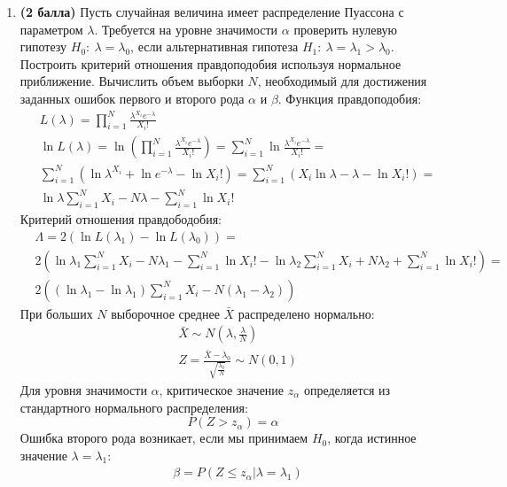 \documentclass{assignment}
\begin{document}
\begin{enumerate}
    \item \textbf{(2 балла)} Пусть случайная величина имеет распределение Пуассона с параметром $\lambda$. Требуется на уровне значимости $\alpha$ проверить нулевую гипотезу $H_0:~ \lambda = \lambda_0$, если альтернативная гипотеза $H_1:~ \lambda = \lambda_1 > \lambda_0$. Построить критерий отношения правдоподобия используя нормальное приближение. Вычислить объем выборки $N$, необходимый для достижения заданных ошибок первого и второго рода $\alpha$ и $\beta$.
    \start
    Функция правдоподобия:
    \begin{align*}
        &L(\lambda) = \prod_{i=1}^{N} \frac{\lambda^{X_i}e^{-\lambda}}{X_i!} \\
        &\ln L(\lambda) = \ln (\prod_{i=1}^{N} \frac{\lambda^{X_i}e^{-\lambda}}{X_i!}) = \sum_{i=1}^{N} \ln\frac{\lambda^{X_i}e^{-\lambda}}{X_i!} = \\
        &\sum_{i=1}^{N} (\ln\lambda^{X_i} + \ln e^{-\lambda} - \ln X_i!) = \sum_{i=1}^{N} (X_i\ln\lambda -\lambda - \ln X_i!) = \\
        &\ln\lambda\sum_{i=1}^{N} X_i - N\lambda - \sum_{i=1}^{N}\ln X_i!
    \end{align*}
    Критерий отношения правдободобия:
    \begin{align*}
        &\Lambda = 2(\ln L(\lambda_1) - \ln L(\lambda_0)) = \\
        &2(\ln\lambda_1\sum_{i=1}^{N} X_i - N\lambda_1 - \sum_{i=1}^{N}\ln X_i! - \ln\lambda_2\sum_{i=1}^{N} X_i + N\lambda_2 + \sum_{i=1}^{N}\ln X_i!) = \\
        &2((\ln\lambda_1 - \ln\lambda_1)\sum_{i=1}^{N} X_i - N(\lambda_1 - \lambda_2))
    \end{align*}
    При больших $N$ выборочное среднее $\bar{X}$ распределено нормально:
    \begin{align*}
        &\bar{X} \sim N(\lambda, \frac{\lambda}{N}) \\
        &Z = \frac{\bar{X} - \lambda_0}{\sqrt{\frac{\lambda_0}{N}}} \sim N(0, 1)
    \end{align*}
    Для уровня значимости $\alpha$, критическое значение $z_{\alpha}$ определяется из стандартного нормального распределения:
    \begin{equation}
        P(Z > z_{\alpha}) = \alpha
    \end{equation}
    Ошибка второго рода возникает, если мы принимаем $H_0$, когда истинное значение $\lambda = \lambda_1$:
    \begin{align*}
        &\beta = P(Z \leq z_{\alpha}|\lambda = \lambda_1) \\

\end{align*}
\end{enumerate}
\end{document}
